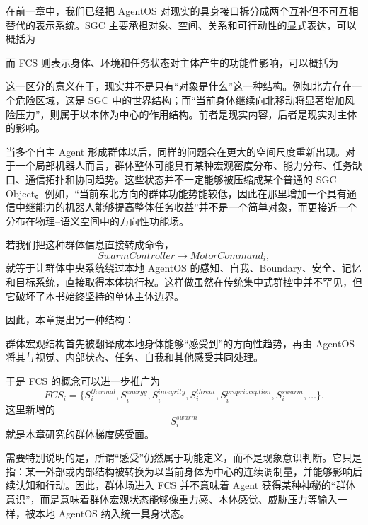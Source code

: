 在前一章中，我们已经把 AgentOS 对现实的具身接口拆分成两个互补但不可互相替代的表示系统。SGC 主要承担对象、空间、关系和可行动性的显式表达，可以概括为
\begin{statementbox}
\centering
{}
\end{statementbox}
而 FCS 则表示身体、环境和任务状态对主体产生的功能性影响，可以概括为
\begin{statementbox}
\centering
{}
\end{statementbox}
这一区分的意义在于，现实并不是只有“对象是什么”这一种结构。例如北方存在一个危险区域，这是 SGC 中的世界结构；而“当前身体继续向北移动将显著增加风险压力”，则属于以本体为中心的作用结构。前者是现实内容，后者是现实对主体的影响。

当多个自主 Agent 形成群体以后，同样的问题会在更大的空间尺度重新出现。对于一个局部机器人而言，群体整体可能具有某种宏观密度分布、能力分布、任务缺口、通信拓扑和协同趋势。这些状态并不一定能够被压缩成某个普通的 SGC Object。例如，“当前东北方向的群体功能势能较低，因此在那里增加一个具有通信中继能力的机器人能够提高整体任务收益”并不是一个简单对象，而更接近一个分布在物理--语义空间中的方向性功能场。

若我们把这种群体信息直接转成命令，
\[
SwarmController
\rightarrow
MotorCommand_i,
\]
就等于让群体中央系统绕过本地 AgentOS 的感知、自我、Boundary、安全、记忆和目标系统，直接取得本体执行权。这样做虽然在传统集中式群控中并不罕见，但它破坏了本书始终坚持的单体主体边界。

因此，本章提出另一种结构：
\begin{statementbox}
\centering
{}
\end{statementbox}
群体宏观结构首先被翻译成本地身体能够“感受到”的方向性趋势，再由 AgentOS 将其与视觉、内部状态、任务、自我和其他感受共同处理。

于是 FCS 的概念可以进一步推广为
\[
FCS_i
=
\{
S_i^{thermal},
S_i^{energy},
S_i^{integrity},
S_i^{threat},
S_i^{proprioception},
S_i^{swarm},
\ldots
\}.
\]
这里新增的
\[
S_i^{swarm}
\]
就是本章研究的群体梯度感受面。

需要特别说明的是，所谓“感受”仍然属于功能定义，而不是现象意识判断。它只是指：某一外部或内部结构被转换为以当前身体为中心的连续调制量，并能够影响后续认知和行动。因此，群体场进入 FCS 并不意味着 Agent 获得某种神秘的“群体意识”，而是意味着群体宏观状态能够像重力感、本体感觉、威胁压力等输入一样，被本地 AgentOS 纳入统一具身状态。


